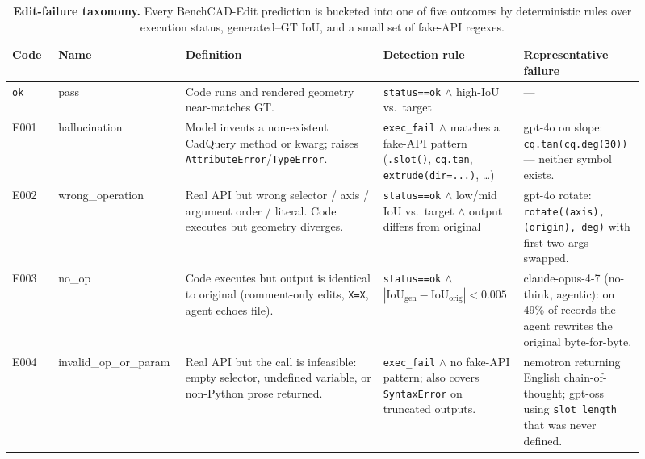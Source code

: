 \begin{table}[t]
\centering
\caption{\textbf{Edit-failure taxonomy.} Every BenchCAD-Edit prediction is bucketed into one of five outcomes by deterministic rules over execution status, generated--GT IoU, and a small set of fake-API regexes.}
\label{tab:error_codes}
\small
\begin{tabular}{@{}p{0.07\linewidth}p{0.16\linewidth}p{0.30\linewidth}p{0.20\linewidth}p{0.18\linewidth}@{}}
\toprule
\textbf{Code} & \textbf{Name} & \textbf{Definition} & \textbf{Detection rule} & \textbf{Representative failure} \\
\midrule
\texttt{ok} & pass & Code runs and rendered geometry near-matches GT. & \texttt{status==ok} $\wedge$ high-IoU vs.\ target & --- \\
E001 & hallucination & Model invents a non-existent CadQuery method or kwarg; raises \texttt{AttributeError}/\texttt{TypeError}. & \texttt{exec\_fail} $\wedge$ matches a fake-API pattern (\texttt{.slot()}, \texttt{cq.tan}, \texttt{extrude(dir=...)}, \ldots) & gpt-4o on slope: \texttt{cq.tan(cq.deg(30))} --- neither symbol exists. \\
E002 & wrong\_operation & Real API but wrong selector / axis / argument order / literal. Code executes but geometry diverges. & \texttt{status==ok} $\wedge$ low/mid IoU vs.\ target $\wedge$ output differs from original & gpt-4o rotate: \texttt{rotate((axis), (origin), deg)} with first two args swapped. \\
E003 & no\_op & Code executes but output is identical to original (comment-only edits, \texttt{X=X}, agent echoes file). & \texttt{status==ok} $\wedge$ $|\mathrm{IoU}_{\text{gen}} - \mathrm{IoU}_{\text{orig}}| < 0.005$ & claude-opus-4-7 (no-think, agentic): on 49\% of records the agent rewrites the original byte-for-byte. \\
E004 & invalid\_op\_or\_param & Real API but the call is infeasible: empty selector, undefined variable, or non-Python prose returned. & \texttt{exec\_fail} $\wedge$ no fake-API pattern; also covers \texttt{SyntaxError} on truncated outputs. & nemotron returning English chain-of-thought; gpt-oss using \texttt{slot\_length} that was never defined. \\
\bottomrule
\end{tabular}
\end{table}

